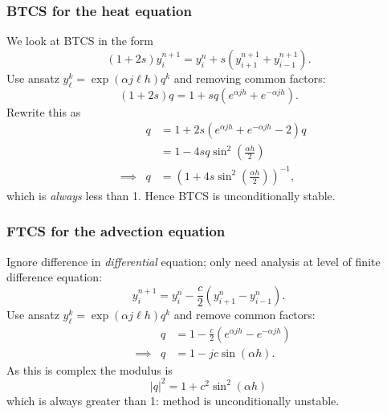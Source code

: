 \documentclass{beamer}
\begin{document}
\begin{frame}
  \frametitle{BTCS for the heat equation}

  We look at BTCS in the form
  \begin{equation*}
    (1 + 2 s) y_i^{n+1} = y_i^n + s \left( y_{i+1}^{n+1} +
      y_{i-1}^{n+1} \right).
  \end{equation*} \pause
  Use ansatz $y_{\ell}^k =  \exp (\alpha j \ell h) q^k$
  and removing common factors:
  \begin{equation*}
    (1 + 2 s) q = 1 + s q \left( e^{\alpha j h} +  e^{-\alpha j h}
    \right).
  \end{equation*} \pause
  Rewrite this as
  \begin{align*}
    && q & = 1 + 2 s \left( e^{\alpha j h} +  e^{-\alpha j h} - 2 \right)
    q \\
    && & = 1 - 4 s q \sin^2 \left( \tfrac{\alpha h}{2} \right) \\
    & \implies & q & = \left( 1 + 4 s \sin^2 \left( \tfrac{\alpha
          h}{2} \right) \right)^{-1},
  \end{align*} \pause
  which is \emph{always} less than 1. Hence BTCS is unconditionally
  stable.

\end{frame}

\begin{frame}
  \frametitle{FTCS for the advection equation}

  Ignore difference in \emph{differential} equation; only need
  analysis at level of finite difference equation:
  \begin{equation*}
    y_i^{n+1} = y_i^n - \frac{c}{2} \left( y_{i+1}^n - y_{i-1}^n
    \right).
  \end{equation*}
  Use ansatz $y_{\ell}^k = \exp (\alpha j \ell h) q^k$ and remove
  common factors:
  \begin{align*}
    && q & = 1 - \frac{c}{2} \left( e^{\alpha j h} - e^{-\alpha j h}
    \right) \\
    & \implies & q & = 1 - j c \sin ( \alpha h ).
  \end{align*} \pause
  As this is complex the modulus is
  \begin{equation*}
    |q|^2 = 1 + c^2 \sin^2 ( \alpha h )
  \end{equation*}
  which is always greater than 1: method is unconditionally unstable.

\end{frame}
\end{document}
